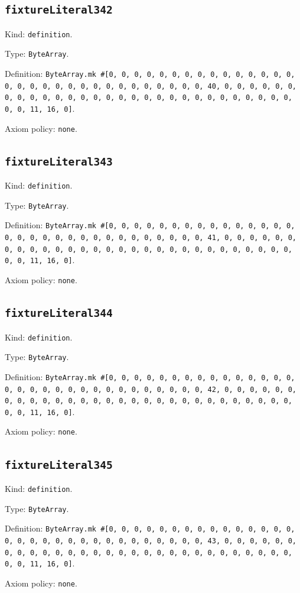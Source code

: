 \documentclass[11pt]{article}
\begin{document}
\subsection*{\texttt{fixtureLiteral342}}
\noindent Kind: \texttt{definition}.\par
\noindent Type: \texttt{ByteArray}.\par
\noindent Definition: \texttt{ByteArray.mk \#[0, 0, 0, 0, 0, 0, 0, 0, 0, 0, 0, 0, 0, 0, 0, 0, 0, 0, 0, 0, 0, 0, 0, 0, 0, 0, 0, 0, 0, 0, 0, 40, 0, 0, 0, 0, 0, 0, 0, 0, 0, 0, 0, 0, 0, 0, 0, 0, 0, 0, 0, 0, 0, 0, 0, 0, 0, 0, 0, 0, 0, 0, 0, 11, 16, 0]}.\par
\noindent Axiom policy: \texttt{none}.\par
\subsection*{\texttt{fixtureLiteral343}}
\noindent Kind: \texttt{definition}.\par
\noindent Type: \texttt{ByteArray}.\par
\noindent Definition: \texttt{ByteArray.mk \#[0, 0, 0, 0, 0, 0, 0, 0, 0, 0, 0, 0, 0, 0, 0, 0, 0, 0, 0, 0, 0, 0, 0, 0, 0, 0, 0, 0, 0, 0, 0, 41, 0, 0, 0, 0, 0, 0, 0, 0, 0, 0, 0, 0, 0, 0, 0, 0, 0, 0, 0, 0, 0, 0, 0, 0, 0, 0, 0, 0, 0, 0, 0, 11, 16, 0]}.\par
\noindent Axiom policy: \texttt{none}.\par
\subsection*{\texttt{fixtureLiteral344}}
\noindent Kind: \texttt{definition}.\par
\noindent Type: \texttt{ByteArray}.\par
\noindent Definition: \texttt{ByteArray.mk \#[0, 0, 0, 0, 0, 0, 0, 0, 0, 0, 0, 0, 0, 0, 0, 0, 0, 0, 0, 0, 0, 0, 0, 0, 0, 0, 0, 0, 0, 0, 0, 42, 0, 0, 0, 0, 0, 0, 0, 0, 0, 0, 0, 0, 0, 0, 0, 0, 0, 0, 0, 0, 0, 0, 0, 0, 0, 0, 0, 0, 0, 0, 0, 11, 16, 0]}.\par
\noindent Axiom policy: \texttt{none}.\par
\subsection*{\texttt{fixtureLiteral345}}
\noindent Kind: \texttt{definition}.\par
\noindent Type: \texttt{ByteArray}.\par
\noindent Definition: \texttt{ByteArray.mk \#[0, 0, 0, 0, 0, 0, 0, 0, 0, 0, 0, 0, 0, 0, 0, 0, 0, 0, 0, 0, 0, 0, 0, 0, 0, 0, 0, 0, 0, 0, 0, 43, 0, 0, 0, 0, 0, 0, 0, 0, 0, 0, 0, 0, 0, 0, 0, 0, 0, 0, 0, 0, 0, 0, 0, 0, 0, 0, 0, 0, 0, 0, 0, 11, 16, 0]}.\par
\noindent Axiom policy: \texttt{none}.\par
\end{document}

